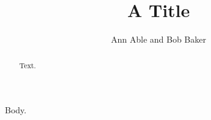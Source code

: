 \documentclass{llncs}
\begin{document}
\title{A Title}
\author{Ann Able and Bob Baker }
\maketitle
\begin{abstract}Text.\end{abstract}
Body.
\end{document}

